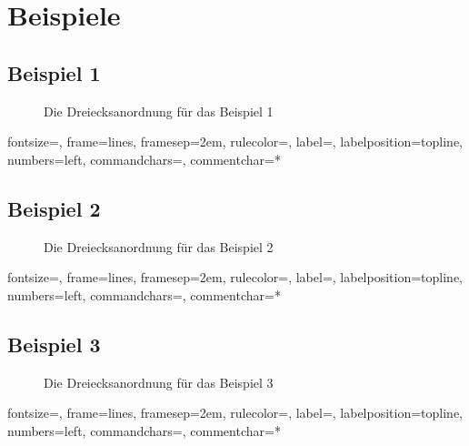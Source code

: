 \documentclass[a4paper, notitlepage, 12pt]{scrartcl}
\begin{document}
\section{Beispiele}
\subsection{Beispiel 1}
\begin{figure}[H] 
	
	\caption{Die Dreiecksanordnung für das Beispiel 1}
\end{figure}
%
{fontsize=\footnotesize,
	frame=lines,  %
	framesep=2em, %
	rulecolor=\color{Gray},
	label=,
	labelposition=topline,
	numbers=left,
	commandchars=\|\(\), %
	commentchar=*        %
}
\subsection{Beispiel 2}
\begin{figure}[H] 
	
	\caption{Die Dreiecksanordnung für das Beispiel 2}
\end{figure}
%
{fontsize=\footnotesize,
	frame=lines,  %
	framesep=2em, %
	rulecolor=\color{Gray},
	label=,
	labelposition=topline,
	numbers=left,
	commandchars=\|\(\), %
	commentchar=*        %
}
\subsection{Beispiel 3}
\begin{figure}[H] 
	
	\caption{Die Dreiecksanordnung für das Beispiel 3}
\end{figure}
%
{fontsize=\footnotesize,
	frame=lines,  %
	framesep=2em, %
	rulecolor=\color{Gray},
	label=,
	labelposition=topline,
	numbers=left,
	commandchars=\|\(\), %
	commentchar=*        %
}
\end{document}
